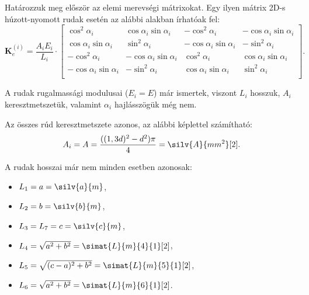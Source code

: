\documentclass[a4paper, 12pt]{scrartcl}
\newcommand{\rmat}[1]{\mathbf{#1}}
\begin{document}
Határozzuk meg először az elemi merevségi mátrixokat. Egy ilyen mátrix 2D-s
húzott-nyomott rudak esetén az alábbi alakban írhatóak fel:
\def\a{\alpha_i}
\begin{equation}
  \rmat{K}_e^{(i)}
  = \frac{A_i E_i}{L_i}
  \cdot
  \begin{bmatrix}
    \cos^2 \a        & \cos \a \sin \a  & -\cos^2 \a       & -\cos \a \sin \a \\
    \cos \a \sin \a  & \sin^2 \a        & -\cos \a \sin \a & -\sin^2 \a       \\
    -\cos^2 \a       & -\cos \a \sin \a & \cos^2 \a        & \cos \a \sin \a  \\
    -\cos \a \sin \a & -\sin^2 \a       & \cos \a \sin \a  & \sin^2 \a        \\
  \end{bmatrix}.
  \label{eq:Ke}
\end{equation}
\let\a\relax
\def\a{\alpha}

A rudak rugalmassági modulusai ($E_i = E$) már ismertek, viszont $L_i$ hosszuk,
$A_i$ keresztmetszetük, valamint $\alpha_i$ hajlásszögük még nem.

Az összes rúd keresztmetszete azonos, az alábbi képlettel számítható:
\begin{equation}
  A_i = A = \frac{((1,3d)^2 - d^2)\pi}{4} = \silv{A}{mm^2}[2].
  \label{eq:A}
\end{equation}

A rudak hosszai már nem minden esetben azonosak:

\begin{minipage}[c]{.26\linewidth}
  \begin{itemize}
    \item $L_1 = a = \silv{a}{m}$,
    \item $L_2 = b = \silv{b}{m}$,
  \end{itemize}
\end{minipage}%
\begin{minipage}[c]{.33\linewidth}
  \begin{itemize}
    \item $L_3 = L_7 = c = \silv{c}{m}$,
    \item $L_4 = \sqrt{a^2 + b^2} = \simat{L}{m}{4}{1}[2]$,
  \end{itemize}
\end{minipage}%
\begin{minipage}[c]{.38\linewidth}
  \begin{itemize}
    \item $L_5 = \sqrt{(c - a)^2 + b^2} = \simat{L}{m}{5}{1}[2]$,
    \item $L_6 = \sqrt{a^2 + b^2} = \simat{L}{m}{6}{1}[2]$.
  \end{itemize}
\end{minipage}
\end{document}
